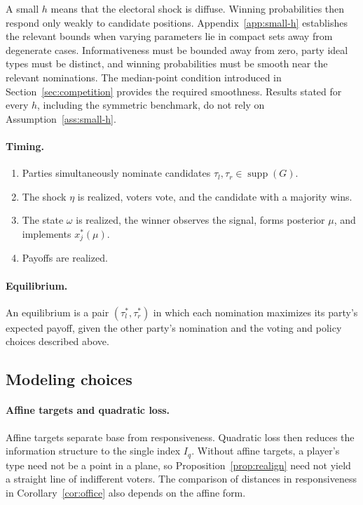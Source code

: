 \documentclass[12pt,letterpaper]{article}
\begin{document}
A small $h$ means that the electoral shock is diffuse. Winning probabilities then respond only weakly to candidate positions. Appendix~\ref{app:small-h} establishes the relevant bounds when varying parameters lie in compact sets away from degenerate cases. Informativeness must be bounded away from zero, party ideal types must be distinct, and winning probabilities must be smooth near the relevant nominations. The median-point condition introduced in Section~\ref{sec:competition} provides the required smoothness. Results stated for every $h$, including the symmetric benchmark, do not rely on Assumption~\ref{ass:small-h}.

\paragraph{Timing.}
\begin{enumerate}
  \item Parties simultaneously nominate candidates $\tau_l,\tau_r\in\operatorname{supp}(G)$.
  \item The shock $\eta$ is realized, voters vote, and the candidate with a majority wins.
  \item The state $\omega$ is realized, the winner observes the signal, forms posterior $\mu$, and implements $x^*_j(\mu)$.
  \item Payoffs are realized.
\end{enumerate}

\paragraph{Equilibrium.}
An equilibrium is a pair $(\tau_l^*,\tau_r^*)$ in which each nomination maximizes its party's expected payoff, given the other party's nomination and the voting and policy choices described above.

\subsection{Modeling choices}\label{sec:choices}

\paragraph{Affine targets and quadratic loss.}
Affine targets separate base from responsiveness. Quadratic loss then reduces the information structure to the single index $I_q$. Without affine targets, a player's type need not be a point in a plane, so Proposition~\ref{prop:realign} need not yield a straight line of indifferent voters. The comparison of distances in responsiveness in Corollary~\ref{cor:office} also depends on the affine form.
\end{document}
